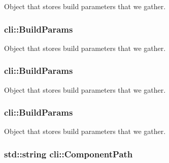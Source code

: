 Object that stores build parameters that we gather. 

\subsubsection[{\texorpdfstring{Build\+Params}{BuildParams}}]{ cli\+::\+Build\+Params\hspace{0.3cm}{\ttfamily [static]}}\hypertarget{namespacecli_a4b3f8be996a29096d321c822dd8a7521}{}\label{namespacecli_a4b3f8be996a29096d321c822dd8a7521}


Object that stores build parameters that we gather. 

\subsubsection[{\texorpdfstring{Build\+Params}{BuildParams}}]{ cli\+::\+Build\+Params\hspace{0.3cm}{\ttfamily [static]}}\hypertarget{namespacecli_a4b3f8be996a29096d321c822dd8a7521}{}\label{namespacecli_a4b3f8be996a29096d321c822dd8a7521}


Object that stores build parameters that we gather. 

\subsubsection[{\texorpdfstring{Build\+Params}{BuildParams}}]{ cli\+::\+Build\+Params\hspace{0.3cm}{\ttfamily [static]}}\hypertarget{namespacecli_a4b3f8be996a29096d321c822dd8a7521}{}\label{namespacecli_a4b3f8be996a29096d321c822dd8a7521}


Object that stores build parameters that we gather. 

\subsubsection[{\texorpdfstring{Component\+Path}{ComponentPath}}]{\setlength{\rightskip}{0pt plus 5cm}std\+::string cli\+::\+Component\+Path}\hypertarget{namespacecli_af06ed68e84cd1ff2ac4b02622b3a1889}{}\label{namespacecli_af06ed68e84cd1ff2ac4b02622b3a1889}


